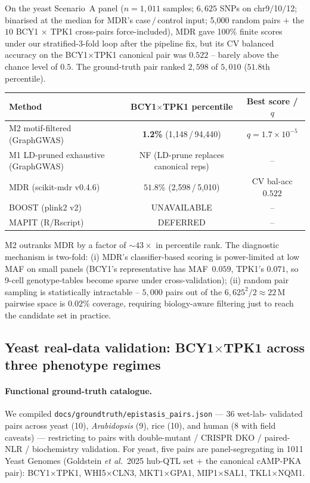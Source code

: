 On the yeast Scenario~A panel ($n=1{,}011$ samples; $6{,}625$ SNPs on
chr9$/$10$/$12; binarised at the median for MDR's case$\,/\,$control input;
5{,}000 random pairs $+$ the $10$ BCY1 $\times$ TPK1 cross-pairs
force-included), MDR gave 100\% finite scores under our stratified-3-fold
loop after the pipeline fix, but its CV balanced accuracy on the BCY1$\times$TPK1
canonical pair was $0.522$ -- barely above the chance level of $0.5$. The
ground-truth pair ranked $2{,}598$ of $5{,}010$ ($51.8$th percentile).

\begin{center}\small
\begin{tabular}{lcc}
\toprule
Method                                & BCY1$\times$TPK1 percentile & Best score / $q$\\
\midrule
M2 motif-filtered (GraphGWAS)         & \textbf{1.2\%} (1{,}148\,/\,94{,}440) & $q=1.7\times10^{-5}$\\
M1 LD-pruned exhaustive (GraphGWAS)   & NF (LD-prune replaces canonical reps) & --\\
MDR (scikit-mdr v0.4.6)               & $51.8$\% (2{,}598\,/\,5{,}010) & CV bal-acc $0.522$\\
BOOST (plink2 v2)                     & UNAVAILABLE & --\\
MAPIT (R/Rscript)                     & DEFERRED & --\\
\bottomrule
\end{tabular}
\end{center}

M2 outranks MDR by a factor of $\sim$$43\times$ in percentile rank. The
diagnostic mechanism is two-fold: (i) MDR's classifier-based scoring
is power-limited at low MAF on small panels (BCY1's representative has
MAF~$0.059$, TPK1's $0.071$, so 9-cell genotype-tables become sparse
under cross-validation); (ii) random pair sampling is statistically
intractable -- $5{,}000$ pairs out of the $6{,}625^2/2 \approx 22\,$M
pairwise space is $0.02$\% coverage, requiring biology-aware filtering
just to reach the candidate set in practice.

\subsection{Yeast real-data validation: BCY1$\times$TPK1 across three
phenotype regimes}\label{sec:yeast_validation}

\paragraph{Functional ground-truth catalogue.}
We compiled \texttt{docs/groundtruth/epistasis\_pairs.json} — 36 wet-lab-
validated pairs across yeast (10), \emph{Arabidopsis} (9), rice (10), and
human (8 with field caveats) — restricting to pairs with double-mutant /
CRISPR DKO / paired-NLR / biochemistry validation. For yeast, five pairs
are panel-segregating in 1011 Yeast Genomes (Goldstein \emph{et al.}\ 2025
hub-QTL set + the canonical cAMP-PKA pair): BCY1$\times$TPK1, WHI5$\times$CLN3,
MKT1$\times$GPA1, MIP1$\times$SAL1, TKL1$\times$NQM1.

